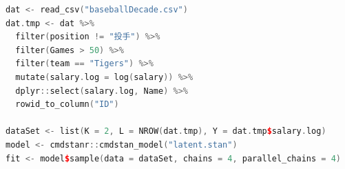 \begin{lstlisting}[language=c++,label={code:26_01},caption={混合分布モデルのコード}]
dat <- read_csv("baseballDecade.csv")
dat.tmp <- dat %>%
  filter(position != "投手") %>%
  filter(Games > 50) %>%
  filter(team == "Tigers") %>%
  mutate(salary.log = log(salary)) %>%
  dplyr::select(salary.log, Name) %>%
  rowid_to_column("ID")

dataSet <- list(K = 2, L = NROW(dat.tmp), Y = dat.tmp$salary.log)
model <- cmdstanr::cmdstan_model("latent.stan")
fit <- model$sample(data = dataSet, chains = 4, parallel_chains = 4)
\end{lstlisting}
